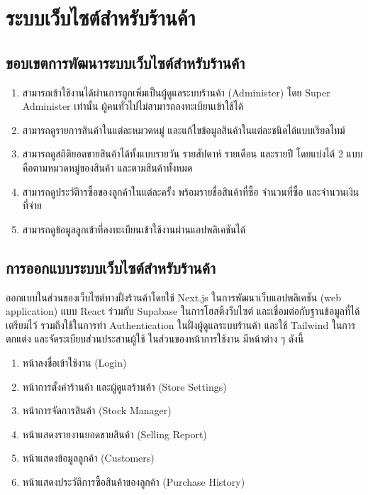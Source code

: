 \section{ระบบเว็บไซต์สำหรับร้านค้า}
\subsection{ขอบเขตการพัฒนาระบบเว็บไซต์สำหรับร้านค้า}
\begin{enumerate}
  \item สามารถเข้าใช้งานได้ผ่านการถูกเพิ่มเป็นผู้ดูแลระบบร้านค้า (Administer) โดย Super Administer เท่านั้น ผู้คนทั่วไปไม่สามารถลงทะเบียนเข้าใช้ได้
  \item สามารถดูรายการสินค้าในแต่ละหมวดหมู่ และแก้ไขข้อมูลสินค้าในแต่ละชนิดได้แบบเรียลไทม์
  \item สามารถดูสถิติยอดขายสินค้าได้ทั้งแบบรายวัน รายสัปดาห์ รายเดือน และรายปี โดยแบ่งได้ 2 แบบ คือตามหมวดหมู่ของสินค้า และตามสินค้าทั้งหมด
  \item สามารถดูประวัติารซื้อของลูกค้าในแต่ละครั้ง พร้อมรายชื่อสินค้าที่ซื้อ จำนวนที่ซื้อ และจำนวนเงินที่จ่าย
  \item สามารถดูข้อมูลลูกเข้าที่ลงทะเบียนเข้าใช้งานผ่านแอปพลิเคชันได้

\end{enumerate}

\subsection{การออกแบบระบบเว็บไซต์สำหรับร้านค้า}
ออกแบบในส่วนของเว็บไซต์ทางฝั่งร้านค้าโดยใช้ Next.js ในการพัฒนาเว็บแอปพลิเคชัน (web application) แบบ React ร่วมกับ Supabase ในการโฮสติ้งว็บไซต์ และเชื่อมต่อกับฐานข้อมูลที่ได้เตรียมไว้ รวมถึงใช้ในการทำ Authentication ในฝั่งผู้ดูแลระบบร้านค้า และใช้ Tailwind ในการตกแต่ง และจัดระเบียบส่วนประสานผู้ใช้ ในส่วนของหน้าการใช้งาน มีหน้าต่าง ๆ ดังนี้
\begin{enumerate}
  \item หน้าลงชื่อเข้าใช้งาน (Login)
  \item หน้าการตั้งค่าร้านค้า และผู้ดูแลร้านค้า (Store Settings)
  \item หน้าการจัดการสินค้า (Stock Manager)
  \item หน้าแสดงรายงานยอดขายสินค้า (Selling Report)
  \item หน้าแสดงข้อมูลลูกค้า (Customers)
  \item หน้าแสดงประวัติการซื้อสินค้าของลูกค้า (Purchase History)

\end{enumerate}

